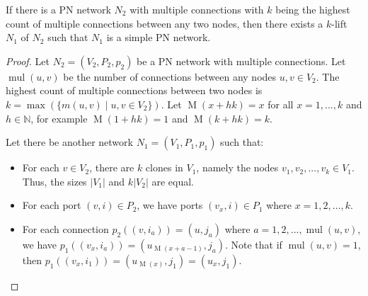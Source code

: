 \begin{lemma} \label{lem:lcl_unsolvability:from_klift_to_simple}
    If there is a PN network $N_2$ with multiple connections with $k$ being the highest count of multiple connections between any two nodes, then there exists a $k$-lift $N_1$ of $N_2$ such that $N_1$ is a simple PN network.
\end{lemma}
\begin{proof}
    Let $N_2=(V_2, P_2, p_2)$ be a PN network with multiple connections.
    Let $\operatorname{mul}(u, v)$ be the number of connections between any nodes $u, v \in V_2$.
    The highest count of multiple connections between two nodes is $k=\max (\{ m(u, v) \mid u, v \in V_2\} )$.
    Let $\operatorname{M}(x+hk) = x$ for all $x = 1, ..., k$ and $h\in \mathbb{N}$, for example $\operatorname{M}(1 + hk) = 1$ and $\operatorname{M}(k + hk) = k$.

    Let there be another network $N_1=(V_1, P_1, p_1)$ such that:
    \begin{itemize}
        \item For each $v \in V_2$, there are $k$ clones in $V_1$, namely the nodes $v_1, v_2, ..., v_k \in V_1$.
        Thus, the sizes $|V_1|$ and $k|V_2|$ are equal.
        \item For each port $(v, i) \in P_2$, we have ports $(v_x, i) \in P_1$ where $x=1, 2, ..., k$.
        \item For each connection $p_2((v, i_a)) = (u, j_a)$ where $a = 1, 2, ..., \operatorname{mul}(u, v)$, we have $p_1((v_{x}, i_a)) = (u_{\operatorname{M}(x+a-1)}, j_a)$.
        Note that if $\operatorname{mul}(u, v) = 1$, then $p_1((v_{x}, i_1)) = (u_{\operatorname{M}(x)}, j_1) = (u_{x}, j_1)$.
    \end{itemize}


\end{proof}

